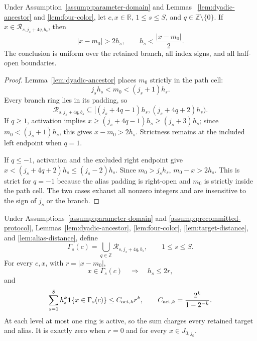 \begin{lemma}
\label{lem:alias-distance}
Under Assumption~\ref{assump:parameter-domain} and Lemmas~
\ref{lem:dyadic-ancestor} and \ref{lem:four-color}, let
$c,x\in\mathbb R$, $1\leq s\leq S$, and
$q\in\mathbb Z\setminus\{0\}$.  If
$x\in\mathcal R_{s,j_s+4q,b_s}$, then
\[
 |x-m_0|>2h_s,
 \qquad h_s<\frac{|x-m_0|}{2}.
\]
The conclusion is uniform over the retained branch, all index signs, and all
half-open boundaries.
\end{lemma}

\begin{proof}
Lemma~\ref{lem:dyadic-ancestor} places $m_0$ strictly in the path cell:
\[
 j_sh_s<m_0<(j_s+1)h_s.
\]
Every branch ring lies in its padding, so
\[
 \mathcal R_{s,j_s+4q,b_s}
 \subseteq[(j_s+4q-1)h_s,(j_s+4q+2)h_s).
\]
If $q\geq1$, activation implies
$x\geq(j_s+4q-1)h_s\geq(j_s+3)h_s$; since
$m_0<(j_s+1)h_s$, this gives $x-m_0>2h_s$.  Strictness remains at the
included left endpoint when $q=1$.

If $q\leq-1$, activation and the excluded right endpoint give
$x<(j_s+4q+2)h_s\leq(j_s-2)h_s$.  Since $m_0>j_sh_s$,
$m_0-x>2h_s$.  This is strict for $q=-1$ because the alias padding is
right-open and $m_0$ is strictly inside the path cell.  The two cases exhaust
all nonzero integers and are insensitive to the sign of $j_s$ or the branch.
\end{proof}

\begin{lemma}
\label{lem:activation-ledger}
Under Assumptions~\ref{assump:parameter-domain} and
\ref{assump:precommitted-protocol}, Lemmas~\ref{lem:dyadic-ancestor},
\ref{lem:four-color}, \ref{lem:target-distance}, and
\ref{lem:alias-distance}, define
\[
 \Gamma_s(c)=\bigcup_{q\in\mathbb Z}
 \mathcal R_{s,j_s+4q,b_s},\qquad 1\leq s\leq S.
\]
For every $c,x$, with $r=|x-m_0|$,
\[
 x\in\Gamma_s(c)\quad\Longrightarrow\quad h_s\leq2r,
\]
and
\[
 \sum_{s=1}^S h_s^k\mathbf1\{x\in\Gamma_s(c)\}
 \leq C_{{\rm act},k}r^k,
 \qquad C_{{\rm act},k}=\frac{2^k}{1-2^{-k}}.
\]
At each level at most one ring is active, so the sum charges every retained
target and alias.  It is exactly zero when $r=0$ and for every
$x\in J_{0,j_0}$.
\end{lemma}


